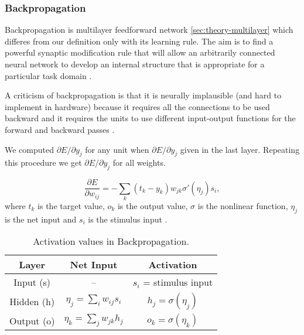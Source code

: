 \subsubsection{Backpropagation}
\label{sec:models-bp} 

Backpropagation is multilayer feedforward network \ref{sec:theory-multilayer} which differes from our definition only with its learning rule. The aim is to find a powerful synaptic modification rule that will allow an arbitrarily connected neural network to develop an internal structure that is appropriate for a particular task domain \citep{rumelhart1986learning}. 

A criticism of backpropagation is that it is neurally implausible (and hard to implement in hardware) because it requires all the connections to be used backward and it requires the units to use different input-output functions for the forward and backward passes \citep{hinton1988learning}.

We computed $\partial E / \partial y_j$ for any unit when $\partial E / \partial y_j$ given in the last layer. Repeating this procedure we get $\partial E / \partial y_j$ for all weights. 

\begin{equation} 
\frac{\partial E}{\partial w_{ij}} = -\sum_k(t_k-y_k)w_{jk}\sigma'(\eta_j)s_i,
\end{equation}
where $t_k$ is the target value, $o_k$ is the output value, $\sigma$ is the nonlinear function, $\eta_j$ is the net input and $s_i$ is the stimulus input \citet{o1996bio}.

\begin{table}
  \centering
  \begin{tabular}{|ccc|}
    \hline
    Layer & Net Input & Activation\\
    \hline
    Input (s)  & -- & $s_i$ = stimulus input\\
    \hline
    Hidden (h) & \hspace{0.3cm} $\eta_j = \sum_i w_{ij}s_i$ \hspace{0.3cm} &
    $h_j = \sigma(\eta_j)$\hspace{0.3cm}\\
    \hline
    Output (o) & \hspace{0.3cm} $\eta_k = \sum_j w_{jk}h_j$ \hspace{0.3cm} & 
    $o_k = \sigma(\eta_k)$\hspace{0.3cm}\\
    \hline
  \end{tabular}
  \caption{Activation values in Backpropagation.}
  \label{tab:models-bp}
\end{table}
